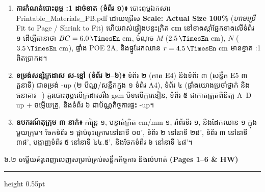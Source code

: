 \documentclass[a4paper,12pt]{article}
\newcommand{\en}[1]{{\TimesEn #1}}
\newcommand{\enbf}[1]{{\TimesEn\textbf{#1}}}
\newcommand{\unit}[1]{\,\text{\en{#1}}}
\newcommand{\cnum}[1]{{\TimesEn\fontsize{10.5pt}{12pt}\selectfont\ding{\numexpr181+#1\relax}}}
\newcommand{\subsectitle}[1]{{\muol\fontsize{11pt}{14.5pt}\selectfont #1}}
\newcommand{\subsec}[1]{%
  \Needspace{1.6cm}%
  \vspace{4pt}%
  \subsectitle{#1}\par%
  \vspace{-2pt}%
  {\color{black}\hrule height 0.55pt}%
  \vspace{3.5pt}%
}
\begin{document}
\begin{enumerate}[leftmargin=0.65cm, itemsep=2.5pt]
  \item \textbf{ការកំណត់បោះពុម្ព \en{1:1} ដាច់ខាត (ទំព័រ ១)៖} បោះពុម្ពឯកសារ \en{Printable\_Materials\_PB.pdf} ដោយជ្រើស \textbf{\en{Scale: Actual Size 100\%}} (\emph{ហាមប្រើ} \en{Fit to Page / Shrink to Fit}) ហើយវាស់ផ្ទៀងបន្ទះក្រិត \textbf{\en{5.0 cm}} នៅខាងស្ដាំផ្នែកខាងលើទំព័រ ១ ដើម្បីធានាថា $BC=6.0\unit{cm}$, ចំណុច $M$ ($2.5\unit{cm}$), $N$ ($3.5\unit{cm}$), ផ្ទាំង \en{POE 2A}, និងធ្នូដែកឈាន $r=4.5\unit{cm}$ មានខ្នាត \en{1:1} ពិតប្រាកដ។
  \item \textbf{ទម្រង់សន្សំក្រដាស ស-ខ្មៅ (ទំព័រ ២--៦)៖} ទំព័រ ២ (កាត \en{E4}) និងទំព័រ ៣ (សន្លឹក \en{E5} ៣ តួនាទី) ជាទម្រង់ \en{2-up} (២ ប័ណ្ណ/សន្លឹកក្នុង ១ ទំព័រ \en{A4}), ទំព័រ ៤ (ផ្ទាំងយោងប្រចាំថ្នាក់ និងធនាគារ \cnum{1}--\cnum{5}) គួរបោះពុម្ពលើក្រដាសរឹង \en{180 gsm} បិទលើក្ដារខៀន, ទំព័រ ៥ ជាកាតត្រួតពិនិត្យ \en{A--D} \en{4-up} + ចម្លើយគ្រូ, និងទំព័រ ៦ ជាប័ណ្ណកិច្ចការផ្ទះ \en{4-up}។
  \item \textbf{ឧបករណ៍តុក្រុម ៣ នាក់៖} កន្ត្រៃ ១, បន្ទាត់ក្រិត \en{cm/mm} ១, រ៉ាព័រទ័រ ១, និងដែកឈាន ១ ក្នុងមួយក្រុម។ ចែកទំព័រ ១ ផ្កាប់ចុះក្រោមនៅនាទី ០០', ទំព័រ ២ នៅនាទី ២៨', ទំព័រ ៣ នៅនាទី ៣៨', បង្ហាញទំព័រ ៥ នៅនាទី ៤៤.៥', និងចែកទំព័រ ៦ នៅនាទី ៤៨'។
\end{enumerate}

\subsec{៦\enbf{.}២ ចម្លើយគំរូពេញលេញសម្រាប់គ្រប់សន្លឹកកិច្ចការ និងលំហាត់ \enbf{(Pages 1--6 \& HW)}}
\end{document}
